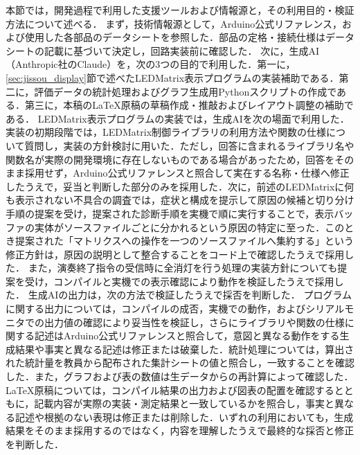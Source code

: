 本節では，開発過程で利用した支援ツールおよび情報源と，その利用目的・検証方法について述べる．
まず，技術情報源として，Arduino公式リファレンス，および使用した各部品のデータシートを参照した．部品の定格・接続仕様はデータシートの記載に基づいて決定し，回路実装前に確認した．
次に，生成AI（Anthropic社のClaude）を，次の3つの目的で利用した．第一に，\ref{sec:jissou_display}節で述べたLEDMatrix表示プログラムの実装補助である．第二に，評価データの統計処理およびグラフ生成用Pythonスクリプトの作成である．第三に，本稿のLaTeX原稿の草稿作成・推敲およびレイアウト調整の補助である．
LEDMatrix表示プログラムの実装では，生成AIを次の場面で利用した．実装の初期段階では，LEDMatrix制御ライブラリの利用方法や関数の仕様について質問し，実装の方針検討に用いた．ただし，回答に含まれるライブラリ名や関数名が実際の開発環境に存在しないものである場合があったため，回答をそのまま採用せず，Arduino公式リファレンスと照合して実在する名称・仕様へ修正したうえで，妥当と判断した部分のみを採用した．次に，前述のLEDMatrixに何も表示されない不具合の調査では，症状と構成を提示して原因の候補と切り分け手順の提案を受け，提案された診断手順を実機で順に実行することで，表示バッファの実体がソースファイルごとに分かれるという原因の特定に至った．このとき提案された「マトリクスへの操作を一つのソースファイルへ集約する」という修正方針は，原因の説明として整合することをコード上で確認したうえで採用した．
また，演奏終了指令の受信時に全消灯を行う処理の実装方針についても提案を受け，コンパイルと実機での表示確認により動作を検証したうえで採用した．
生成AIの出力は，次の方法で検証したうえで採否を判断した．
プログラムに関する出力については，コンパイルの成否，実機での動作，およびシリアルモニタでの出力値の確認により妥当性を検証し，さらにライブラリや関数の仕様に関する記述はArduino公式リファレンスと照合して，意図と異なる動作をする生成結果や事実と異なる記述は修正または破棄した．統計処理については，算出された統計量を教員から配布された集計シートの値と照合し，一致することを確認した．また，グラフおよび表の数値は生データからの再計算によって確認した．LaTeX原稿については，コンパイル結果の出力および図表の配置を確認するとともに，記載内容が実際の実装・測定結果と一致しているかを照合し，事実と異なる記述や根拠のない表現は修正または削除した．いずれの利用においても，生成結果をそのまま採用するのではなく，内容を理解したうえで最終的な採否と修正を判断した．

\FloatBarrier
